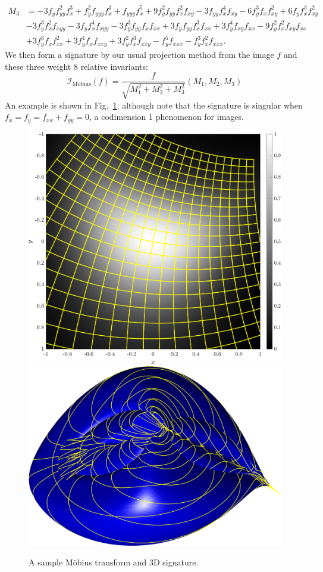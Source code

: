 \documentclass{artjlt}
\begin{document}
\begin{align*}
M_3&=-3 f_y  f_{yy}^2 f_x ^3 + 
 f_y ^2 f_{yyy} f_x ^3 + f_{yyy} f_x ^5 + 
 9 f_y ^2 f_{yy} f_x ^2 f_{xy} - 
 3 f_{yy} f_x ^4 f_{xy} - 6 f_y ^3 f_x  f_{xy}^2 + 
 6 f_y  f_x ^3 f_{xy}^2 \\ \nonumber
&- 3 f_y ^3 f_x ^2 f_{xyy} - 
 3 f_y  f_x ^4 f_{xyy} - 3 f_y ^3 f_{yy} f_x  f_{xx} + 
 3 f_y  f_{yy} f_x ^3 f_{xx} + 3 f_y ^4 f_{xy} f_{xx} - 
 9 f_y ^2 f_x ^2 f_{xy} f_{xx} \\ \nonumber
 &+ 3 f_y ^3 f_x  f_{xx}^2 + 3 f_y ^4 f_x  f_{xxy} + 
 3 f_y ^2 f_x ^3 f_{xxy} - f_y ^5 f_{xxx} - 
 f_y ^3 f_x ^2 f_{xxx}.
\end{align*}
We then form a signature by our usual projection method from the image $f$
and these three weight $8$ relative invariants:
\begin{equation}
    \label{eq:mobiussignature}
    \mathcal{I}_{\text{M\"obius}}(f) = \frac{f}{\sqrt{M_1^2 + M_2^2 +
    M_3^2}} (M_1, M_2, M_3)
\end{equation}
An example is shown in Fig.~\ref{fig:mobius}, although note that the
signature is singular when $f_x=f_y=f_{xx}+f_{yy}=0$, a codimension 1
phenomenon for images. 
\begin{figure}
\centering
\includegraphics[width=.45\textwidth]{Figs/f_transformed_Mobius.png}
\includegraphics[width=.45\textwidth]{Figs/Mobius_signature.png}
\caption{A sample M\"obius transform and 3D signature.}
\label{fig:mobius}
\end{figure}

\end{document}
